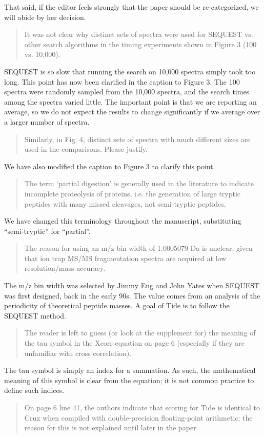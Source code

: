 \documentclass{article}
\newcommand{\breview}{\begin{quotation}\begin{em}\noindent}
\newcommand{\ereview}{\end{em}\end{quotation}}
\begin{document}
That said, if the editor feels strongly that the paper should be
re-categorized, we will abide by her decision.

\breview
It was not clear why distinct sets of spectra were used for SEQUEST
vs. other search algorithms in the timing experiments shown in Figure
3 (100 vs. 10,000). 
\ereview

SEQUEST is so slow that running the search on 10,000 spectra simply
took too long.  This point has now been clarified in the caption to
Figure 3.  The 100 spectra were randomly sampled from the 10,000
spectra, and the search times among the spectra varied little. The
important point is that we are reporting an average, so we do not
expect the results to change significantly if we average over a larger
number of spectra.

\breview
Similarly, in Fig. 4, distinct sets of spectra with much different
sizes are used in the comparisons. Please justify.
\ereview

We have also modified the caption to Figure 3 to clarify this point.

\breview
The term `partial digestion' is generally used in the literature to
indicate incomplete proteolysis of proteins, i.e. the generation of
large tryptic peptides with many missed cleavages, not semi-tryptic
peptides. 
\ereview

We have changed this terminology throughout the manuscript,
substituting ``semi-tryptic'' for ``partial''.

\breview
The reason for using an m/z bin width of 1.0005079 Da is unclear,
given that ion trap MS/MS fragmentation spectra are acquired at low
resolution/mass accuracy. 
\ereview

The m/z bin width was selected by Jimmy Eng and John Yates when
SEQUEST was first designed, back in the early 90s.  The value comes
from an analysis of the periodicity of theoretical peptide masses.
A goal of Tide is to follow the SEQUEST method.

\breview
The reader is left to guess (or look at the supplement for) the
meaning of the tau symbol in the Xcorr equation on page 6 (especially
if they are unfamiliar with cross correlation). 
\ereview

The tau symbol is simply an index for a summation.  As such, the
mathematical meaning of this symbol is clear from the equation; it is
not common practice to define such indices.

\breview
On page 6 line 41, the authors indicate that scoring for Tide is
identical to Crux when compiled with double-precision floating-point
arithmetic; the reason for this is not explained until later in the
paper. 
\ereview
\end{document}
